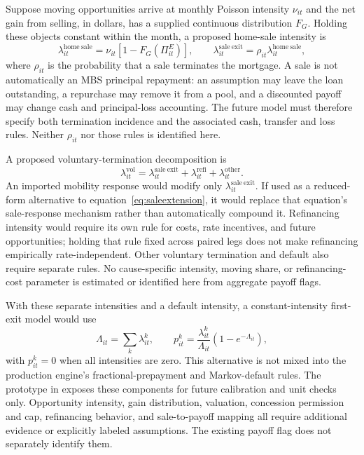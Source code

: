 Suppose moving opportunities arrive at monthly Poisson intensity $\nu_{it}$ and the net gain from selling, in dollars, has a supplied continuous distribution $F_G$. Holding these objects constant within the month, a proposed home-sale intensity is
\begin{equation}
\lambda^{\mathrm{home\ sale}}_{it}=\nu_{it}[1-F_G(\Pi^E_{it})],\qquad
\lambda^{\mathrm{sale\ exit}}_{it}=\rho_{it}\lambda^{\mathrm{home\ sale}}_{it},
\label{eq:saleextension}
\end{equation}
where $\rho_{it}$ is the probability that a sale terminates the mortgage. A sale is not automatically an MBS principal repayment: an assumption may leave the loan outstanding, a repurchase may remove it from a pool, and a discounted payoff may change cash and principal-loss accounting. The future model must therefore specify both termination incidence and the associated cash, transfer and loss rules. Neither $\rho_{it}$ nor those rules is identified here.

A proposed voluntary-termination decomposition is
\begin{equation}
\lambda^{\mathrm{vol}}_{it}=\lambda^{\mathrm{sale\ exit}}_{it}
+\lambda^{\mathrm{refi}}_{it}+\lambda^{\mathrm{other}}_{it}.
\label{eq:voluntarydecomposition}
\end{equation}
An imported mobility response would modify only $\lambda^{\mathrm{sale\ exit}}_{it}$. If used as a reduced-form alternative to equation~\eqref{eq:saleextension}, it would replace that equation's sale-response mechanism rather than automatically compound it. Refinancing intensity would require its own rule for costs, rate incentives, and future opportunities; holding that rule fixed across paired legs does not make refinancing empirically rate-independent. Other voluntary termination and default also require separate rules. No cause-specific intensity, moving share, or refinancing-cost parameter is estimated or identified here from aggregate payoff flags.

With these separate intensities and a default intensity, a constant-intensity first-exit model would use
\begin{equation}
\Lambda_{it}=\sum_k\lambda^k_{it},\qquad
p^k_{it}=\frac{\lambda^k_{it}}{\Lambda_{it}}(1-e^{-\Lambda_{it}}),
\label{eq:structuralcompeting}
\end{equation}
with $p^k_{it}=0$ when all intensities are zero. This alternative is not mixed into the production engine's fractional-prepayment and Markov-default rules. The prototype in  exposes these components for future calibration and unit checks only. Opportunity intensity, gain distribution, valuation, concession permission and cap, refinancing behavior, and sale-to-payoff mapping all require additional evidence or explicitly labeled assumptions. The existing payoff flag does not separately identify them.

